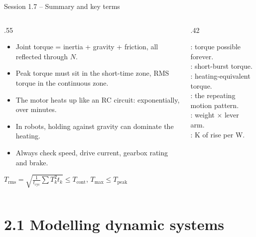 \documentclass[aspectratio=169,10pt]{beamer}
\begin{document}
\begin{frame}{Session 1.7 -- Summary and key terms}
\begin{columns}[T]
\begin{column}{.55\textwidth}
\small
\begin{itemize}
\item Joint torque = inertia + gravity + friction, all reflected through $N$.
\item Peak torque must sit in the short-time zone, RMS torque in the continuous zone.
\item The motor heats up like an RC circuit: exponentially, over minutes.
\item In robots, holding against gravity can dominate the heating.
\item Always check speed, drive current, gearbox rating and brake.
\end{itemize}
\begin{keybox}[Remember]
$T_\text{rms}=\sqrt{\tfrac{1}{t_\text{cyc}}\sum T_k^2t_k}\le T_\text{cont}$, \quad $T_\text{max}\le T_\text{peak}$
\end{keybox}
\end{column}
\begin{column}{.42\textwidth}
\begin{defbox}
\small
{}: torque possible forever.\\
: short-burst torque.\\
: heating-equivalent torque.\\
: the repeating motion pattern.\\
: weight $\times$ lever arm.\\
: K of rise per W.
\end{defbox}
\end{column}
\end{columns}
\end{frame}

\section{2.1 Modelling dynamic systems}
\end{document}
